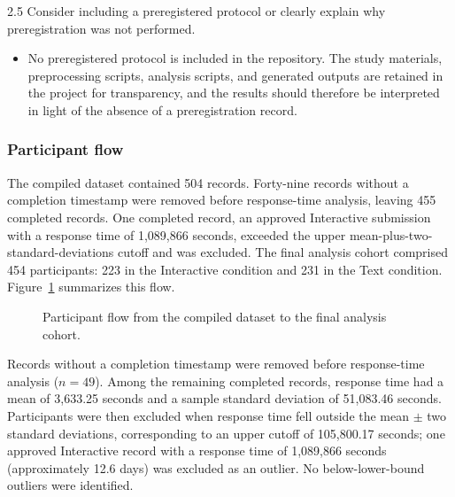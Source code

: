 2.5  Consider including a preregistered protocol or clearly explain why preregistration was not performed.
\begin{itemize}
\item[Response:] No preregistered protocol is included in the repository. The study materials, preprocessing scripts, analysis scripts, and generated outputs are retained in the project for transparency, and the results should therefore be interpreted in light of the absence of a preregistration record.
\end{itemize}

\subsubsection{Participant flow}\label{sec:participant-flow}
The compiled dataset contained 504 records. Forty-nine records without a completion timestamp were removed before response-time analysis, leaving 455 completed records. One completed record, an approved Interactive submission with a response time of 1,089,866 seconds, exceeded the upper mean-plus-two-standard-deviations cutoff and was excluded. The final analysis cohort comprised 454 participants: 223 in the Interactive condition and 231 in the Text condition. Figure~\ref{fig:participant-flow} summarizes this flow.

\begin{figure}[htbp]
\centering
{}
\caption{Participant flow from the compiled dataset to the final analysis cohort.}
\label{fig:participant-flow}
\end{figure}


Records without a completion timestamp were removed before response-time analysis ($n=49$). Among the remaining completed records, response time had a mean of 3,633.25 seconds and a sample standard deviation of 51,083.46 seconds. Participants were then excluded when response time fell outside the mean $\pm$ two standard deviations, corresponding to an upper cutoff of 105,800.17 seconds; one approved Interactive record with a response time of 1,089,866 seconds (approximately 12.6 days) was excluded as an outlier. No below-lower-bound outliers were identified.


